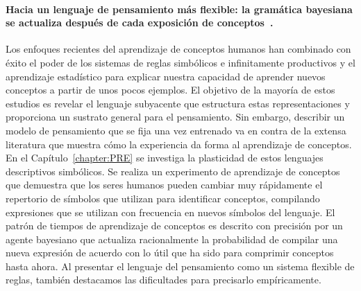 \paragraph{Hacia un lenguaje de pensamiento más flexible: la gramática bayesiana se actualiza después de cada exposición de conceptos~\cite{tano2020towards}.}
Los enfoques recientes del aprendizaje de conceptos humanos han combinado con éxito el poder de los sistemas de reglas simbólicos e infinitamente productivos y el aprendizaje estadístico para explicar nuestra capacidad de aprender nuevos conceptos a partir de unos pocos ejemplos. El objetivo de la mayoría de estos estudios es revelar el lenguaje subyacente que estructura estas representaciones y proporciona un sustrato general para el pensamiento. Sin embargo, describir un modelo de pensamiento que se fija una vez entrenado va en contra de la extensa literatura que muestra cómo la experiencia da forma al aprendizaje de conceptos. En el Capítulo~\ref{chapter:PRE} se investiga la plasticidad de estos lenguajes descriptivos simbólicos. Se realiza un experimento de aprendizaje de conceptos que demuestra que los seres humanos pueden cambiar muy rápidamente el repertorio de símbolos que utilizan para identificar conceptos, compilando expresiones que se utilizan con frecuencia en nuevos símbolos del lenguaje. El patrón de tiempos de aprendizaje de conceptos es descrito con precisión por un agente bayesiano que actualiza racionalmente la probabilidad de compilar una nueva expresión de acuerdo con lo útil que ha sido para comprimir conceptos hasta ahora. Al presentar el lenguaje del pensamiento como un sistema flexible de reglas, también destacamos las dificultades para precisarlo empíricamente.

